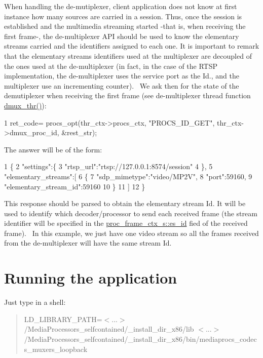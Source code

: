 When handling the de-\/mutiplexer, client application does not know at first instance how many sources are carried in a session. Thus, once the session is established and the multimedia streaming started -\/that is, when receiving the first frame-\/, the de-\/multiplexer A\+PI should be used to know the elementary streams carried and the identifiers assigned to each one. It is important to remark that the elementary streams identifiers used at the multiplexer are decoupled of the ones used at the de-\/multiplexer (in fact, in the case of the R\+T\+SP implementation, the de-\/multiplexer uses the service port as the Id., and the multiplexer use an incrementing counter).~\newline
 We ask then for the state of the demutiplexer when receiving the first frame (see de-\/multiplexer thread function \textquotesingle{}\hyperlink{codecs__muxers__loopback_8c_ae66adca53cb5b2afde52cb2381a2384a}{dmux\+\_\+thr()}\textquotesingle{})\+: 
\begin{DoxyCode}
1 ret\_code= procs\_opt(thr\_ctx->procs\_ctx, "PROCS\_ID\_GET", thr\_ctx->dmux\_proc\_id, &rest\_str);
\end{DoxyCode}
 The answer will be of the form\+: 
\begin{DoxyCode}
1 \{
2    "settings":\{
3       "rtsp\_url":"rtsp://127.0.0.1:8574/session"
4    \},
5    "elementary\_streams":[
6       \{
7          "sdp\_mimetype":"video/MP2V",
8          "port":59160,
9          "elementary\_stream\_id":59160
10       \}
11    ]
12 \}
\end{DoxyCode}
 This response should be parsed to obtain the elementary stream Id. It will be used to identify which decoder/processor to send each received frame (the stream identifier will be specified in the \hyperlink{structproc__frame__ctx__s_a457dcb8ae6440506054f07483f48be1f}{proc\+\_\+frame\+\_\+ctx\+\_\+s\+::es\+\_\+id} fied of the received frame).~\newline
 In this example, we just have one video stream so all the frames received from the de-\/multiplexer will have the same stream Id.

\section*{Running the application }

Just type in a shell\+:

\begin{quote}
L\+D\+\_\+\+L\+I\+B\+R\+A\+R\+Y\+\_\+\+P\+A\+TH=$<$...$>$/\+Media\+Processors\+\_\+selfcontained/\+\_\+install\+\_\+dir\+\_\+x86/lib $<$...$>$/\+Media\+Processors\+\_\+selfcontained/\+\_\+install\+\_\+dir\+\_\+x86/bin/mediaprocs\+\_\+codecs\+\_\+muxers\+\_\+loopback \end{quote}


